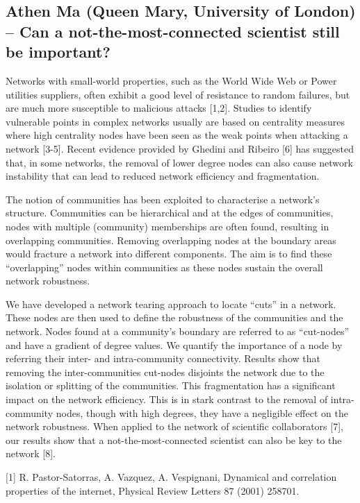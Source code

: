 \documentclass[10pt]{article}
\begin{document}
\begin{multicols}{2}
\subsection*{Athen Ma (Queen Mary, University of London) – Can a not-the-most-connected scientist still be important?}

Networks with small-world properties, such as the World Wide Web or Power utilities suppliers, often exhibit a good level of resistance to random failures, but are much more susceptible to malicious attacks [1,2]. Studies to identify vulnerable points in complex networks usually are based on centrality measures where high centrality nodes have been seen as the weak points when attacking a network [3-5]. Recent evidence provided by Ghedini and Ribeiro [6] has suggested that, in some networks, the removal of lower degree nodes can also cause network instability that can lead to reduced network efficiency and fragmentation.

The notion of communities has been exploited to characterise a network’s structure. Communities can be hierarchical and at the edges of communities, nodes with multiple (community) memberships are often found, resulting in overlapping communities. Removing overlapping nodes at the boundary areas would fracture a network into different components. The aim is to find these “overlapping” nodes within communities as these nodes sustain the overall network robustness.

We have developed a network tearing approach to locate “cuts” in a network. These nodes are then used to define the robustness of the communities and the network. Nodes found at a community’s boundary are referred to as “cut-nodes” and have a gradient of degree values. We quantify the importance of a node by referring their inter- and intra-community connectivity. Results show that removing the inter-communities cut-nodes disjoints the network due to the isolation or splitting of the communities. This fragmentation has a significant impact on the network efficiency. This is in stark contrast to the removal of intra-community nodes, though with high degrees, they have a negligible effect on the network robustness. When applied to the network of scientific collaborators [7], our results show that a not-the-most-connected scientist can also be key to the network [8].

    [1] R. Pastor-Satorras, A. Vazquez, A. Vespignani, Dynamical and correlation properties of the internet, Physical Review Letters 87 (2001) 258701.


\end{multicols}
\end{document}
